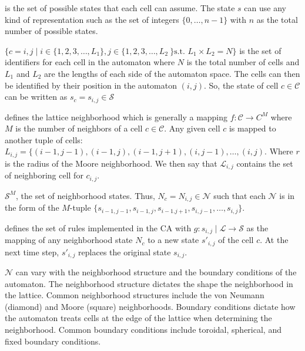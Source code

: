 \begin{CAdef}
    \itemS is the set of possible states that each cell can assume. The state $s$ can use any kind of representation such as the set of integers $\lbrace 0,\ldots,n-1\rbrace$ with $n$ as the total number of possible states.
    
    \itemC $\lbrace c = {i,j} \mid i \in \lbrace 1,2,3,\dots,L_1 \rbrace, j \in \lbrace 1,2,3,\dots,L_2\ \rbrace \text{s.t. } L_1 \times L_2 = N \rbrace$ is the set of identifiers for each cell in the automaton where $N$ is the total number of cells and $L_1$ and $L_2$ are the lengths of each side of the automaton space. The cells can then be identified by their position in the automaton $(i,j)$. So, the state of cell $c \in \mathcal{C}$ can be written as $s_c = s_{i,j} \in \mathcal{S}$
    
    \itemL defines the lattice neighborhood which is generally a mapping $f : \mathcal{C} \rightarrow C^M$ where $M$ is the number of neighbors of a cell $c \in \mathcal{C}$. Any given cell $c$ is mapped to another tuple of cells: $L_{i,j} = \lbrace (i-1,j-1), (i-1, j), (i-1, j+1), (i, j-1), \dots, (i,j)$. Where $r$ is the radius of the Moore neighborhood. We then say that $\mathcal{L}_{i,j}$ contains the set of neighboring cell for $c_{i,j}$.
    
    \itemN $\mathcal{S}^M$, the set of neighborhood states. Thus, $N_c = N_{i,j} \in \mathcal{N}$ such that each $\mathcal{N}$ is in the form of the $M$-tuple $\lbrace s_{i-1,j-1}, s_{i-1, j}, s_{i-1. j+1}, s_{i, j-1}, \dots, s_{i,j} \rbrace$.
    
    \itemR defines the set of rules implemented in the CA with $g : s_{i,j} \mid \mathcal{L} \rightarrow \mathcal{S}$ as the mapping of any neighborhood state $N_c$ to a new state $s'_{i,j}$ of the cell $c$. At the next time step, $s'_{i,j}$ replaces the original state $s_{i,j}$.
\end{CAdef}

$\mathcal{N}$ can vary with the neighborhood structure and the boundary conditions of the automaton. 
The neighborhood structure dictates the shape the neighborhood in the lattice. 
Common neighborhood structures include the von Neumann (diamond) and Moore (square) neighborhoods. 
Boundary conditions dictate how the automaton treats cells at the edge of the lattice when determining the neighborhood. 
Common boundary conditions include toroidal, spherical, and fixed boundary conditions. 

